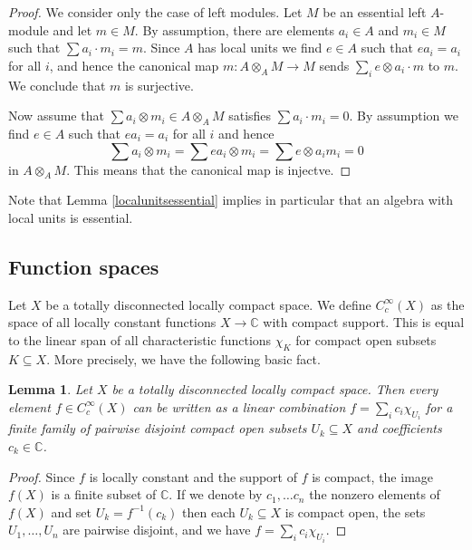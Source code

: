 \documentclass{amsart}
\newtheorem{lemma}[thm]{Lemma}
\newcommand{\ccinfty}{C_c^\infty}
\begin{document}
\begin{proof} 
We consider only the case of left modules. Let $ M $ be an essential left $ A $-module and let $ m \in M $. By assumption, there are elements $ a_i \in A $ and $ m_i \in M $ such that $ \sum a_i \cdot m_i = m $. Since $ A $ has local units we find $ e \in A $ such that $ e a_i = a_i $ for all $ i $, and hence the canonical map $ m: A \otimes_A M \rightarrow M $ sends $ \sum_i e \otimes a_i \cdot m $ to $ m $. We conclude that $ m $ is surjective. 

Now assume that $ \sum a_i \otimes m_i \in A \otimes_A M $ satisfies $ \sum a_i \cdot m_i = 0 $. By assumption we find $ e \in A $ such that $ e a_i = a_i $ for all $ i $ and hence 
$$
\sum a_i \otimes m_i = \sum ea_i \otimes m_i = \sum e \otimes a_i m_i = 0 
$$
in $ A \otimes_A M $. This means that the canonical map is injectve. 
\end{proof}

Note that Lemma \ref{localunitsessential} implies in particular that an algebra with local units is essential. 

\subsection{Function spaces}

Let $ X $ be a totally disconnected locally compact space. We define $ \ccinfty(X) $ 
as the space of all locally constant functions $ X \rightarrow \mathbb{C} $ with compact support. 
This is equal to the linear span of all characteristic functions $ \chi_K $ for compact open subsets $ K \subseteq X $. More precisely, we have the following basic fact. 

\begin{lemma} \label{lemma:funct.local.disc.tensor}
Let $ X $ be a totally disconnected locally compact space. 
Then every element $ f \in \ccinfty(X) $ can be written as a linear combination $ f = \sum_i c_i \chi_{U_i} $ for a finite family of pairwise disjoint compact open subsets $ U_k \subseteq X $ and coefficients $ c_k \in \mathbb{C} $. 
\end{lemma}

\begin{proof}
Since $ f $ is locally constant and the support of $ f $ is compact, the image $ f(X) $ is a finite subset of $ \mathbb{C} $. If we denote by $ c_1, \dots c_n $ the nonzero 
elements of $ f(X) $ and set $ U_k = f^{-1}(c_k) $ then each $ U_k \subseteq X $ is compact open, the sets $ U_1, \dots, U_n $ are pairwise disjoint, and we 
have $ f = \sum_i c_i \chi_{U_i} $.
\end{proof}
\end{document}
